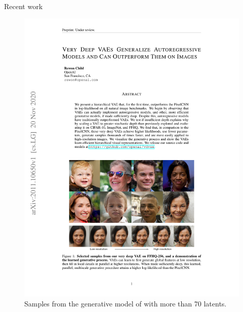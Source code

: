 \begin{frame}{Recent work}
    \begin{figure}[\textwidth]
        \centering
        \includegraphics[scale=0.7]{figures/child_faces.pdf}
        \caption{Samples from the generative model of \cite{child_very_2021} with more than 70 latents.}
    \end{figure}
\end{frame}
